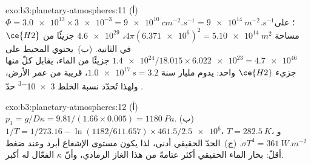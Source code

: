 \begin{solution}{exo:b3:planetary-atmospheres:11}
(أ)~$\Phi = \num{3.0e13}\times\num{3e-3} = \qty{9e10}{cm^{-2}.s^{-1}} =
\qty{9e14}{m^{-2}.s^{-1}}$؛ على مساحة $4\pi(\num{6.371e6})^2 =
\qty{5.10e14}{m^2}$، $\num{4.6e29}$ جزيئًا من $\ce{H2}$ في الثانية.
(ب)~يحتوي المحيط على $\num{1.4e24}/18.015\times\num{6.022e23} =
\num{4.7e46}$ جزيئًا من الماء، يقابل كلّ منها جزيء $\ce{H2}$ واحد: يدوم
$\qty{1.0e17}{s} = \num{3.2}\text{ مليار سنة}$، قريبة من عمر
الأرض، ولهذا تُحدّد نسبة الخلط \num{3e-3} حدّ
.
\end{solution}

\begin{solution}{exo:b3:planetary-atmospheres:12}
(أ)~$p_1 = g/D\kappa = 9.81/(1.66\times0.005) = \qty{1180}{Pa}$.
(ب)~$1/T = 1/273.16 - \ln(1182/611.657)\times461.5/\num{2.5e6}$، $T =
\qty{282.5}{K}$، و$\sigma T^4 = \qty{361}{W.m^{-2}}$. (ج)~الحدّ الحقيقي
أدنى، لذا يكون مستوى الإشعاع أبرد وعند ضغط أقلّ: بخار الماء
الحقيقي أكثر عتامةً من هذا الغاز الرمادي، وأنّ $\kappa$ الفعّال له
أكبر.
\end{solution}

